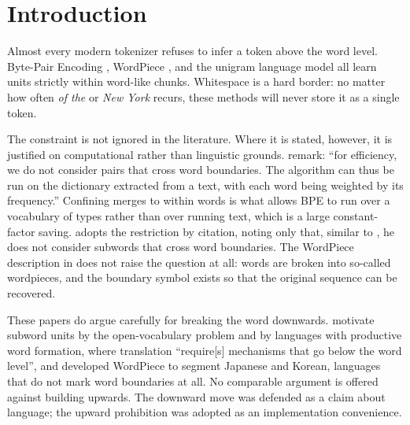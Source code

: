 \documentclass[pdflatex,sn-apa]{sn-jnl}
\begin{document}
\section{Introduction}
\label{sec:intro}

Almost every modern tokenizer refuses to infer a token above the word level.
Byte-Pair Encoding \citep[BPE;][]{sennrich-etal-2016-neural}, WordPiece
\citep{schuster2012japanese,wu2016googles}, and the unigram language model
\citep{kudo-2018-subword,kudo-richardson-2018-sentencepiece} all learn units
strictly within word-like chunks.
Whitespace is a hard border: no matter how often \emph{of the} or
\emph{New York} recurs, these methods will never store it as a single token.

The constraint is not ignored in the literature. Where it is stated, however, it is justified
on computational rather than linguistic grounds.
\citet{sennrich-etal-2016-neural} remark: ``for efficiency,
we do not consider pairs that cross word boundaries. The algorithm can thus be
run on the dictionary extracted from a text, with each word being weighted by
its frequency.'' Confining merges to within words is what allows BPE to run
over a vocabulary of types rather than over running text, which is a large
constant-factor saving. \citet{kudo-2018-subword} adopts the restriction by
citation, noting only that, similar to \citet{sennrich-etal-2016-neural}, he
does not consider subwords that cross word boundaries. The WordPiece
description in \citet{wu2016googles} does not raise the question at all: words
are broken into so-called wordpieces, and the boundary symbol exists so that the
original sequence can be recovered.

These papers do argue carefully for
breaking the word downwards. \citet{sennrich-etal-2016-neural} motivate
subword units by the open-vocabulary problem and by languages with productive
word formation, where translation ``require[s] mechanisms that go below the
word level'', and \citet{schuster2012japanese} developed WordPiece to segment
Japanese and Korean, languages that do not mark word boundaries at all. No
comparable argument is offered against building upwards. The downward move was
defended as a claim about language; the upward prohibition was adopted as an
implementation convenience. %
\end{document}
